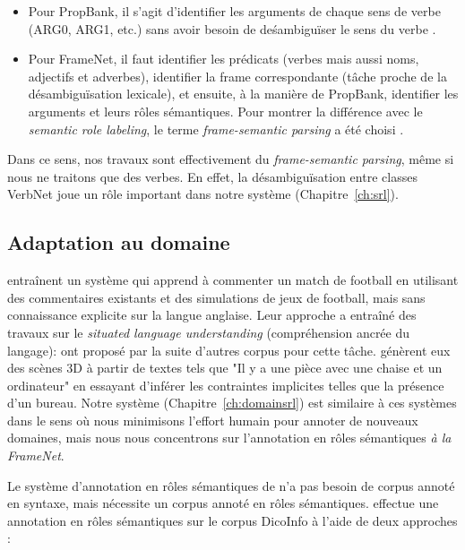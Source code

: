 \begin{itemize}
    \item Pour PropBank, il s'agit d'identifier les arguments de chaque sens de
        verbe (ARG0, ARG1, etc.) sans avoir besoin de deśambiguïser le sens du
        verbe \citep{carreras2005introduction}.
    \item Pour FrameNet, il faut identifier les prédicats (verbes mais aussi
        noms, adjectifs et adverbes), identifier la frame correspondante (tâche
        proche de la désambiguïsation lexicale), et ensuite, à la manière de
        PropBank, identifier les arguments et leurs rôles sémantiques. Pour
        montrer la différence avec le \textit{semantic role labeling}, le terme
        \textit{frame-semantic parsing} a été choisi
        \citep{das2010probabilistic}.
\end{itemize}

Dans ce sens, nos travaux sont effectivement du \textit{frame-semantic
parsing}, même si nous ne traitons que des verbes. En effet, la
désambiguïsation entre classes VerbNet joue un rôle important dans notre
système (Chapitre~\ref{ch:srl}).


\subsection{Adaptation au domaine}

\cite{chen2008learning} entraînent un système qui apprend à commenter un match
de football en utilisant des commentaires existants et des simulations de jeux
de football, mais sans connaissance explicite sur la langue anglaise.  Leur
approche a entraîné des travaux sur le \textit{situated language understanding}
(compréhension ancrée du langage):
\cite{bordes2010towards,richardson2012towards} ont proposé par la suite
d'autres corpus pour cette tâche. \cite{chang2014learning} génèrent eux des
scènes 3D à partir de textes tels que "Il y a une pièce avec une chaise et un
ordinateur" en essayant d'inférer les contraintes implicites telles que la
présence d'un bureau. Notre système (Chapitre~\ref{ch:domainsrl}) est similaire
à ces systèmes dans le sens où nous minimisons l'effort humain pour annoter de
nouveaux domaines, mais nous nous concentrons sur l'annotation en rôles
sémantiques \textit{à la FrameNet}.

Le système d'annotation en rôles sémantiques de \cite{gormley2014low} n'a pas
besoin de corpus annoté en syntaxe, mais nécessite un corpus annoté en rôles
sémantiques. \cite{hadouche2011annotation} effectue une annotation en rôles
sémantiques sur le corpus DicoInfo \citep{corpusolst} à l'aide de deux
approches :

